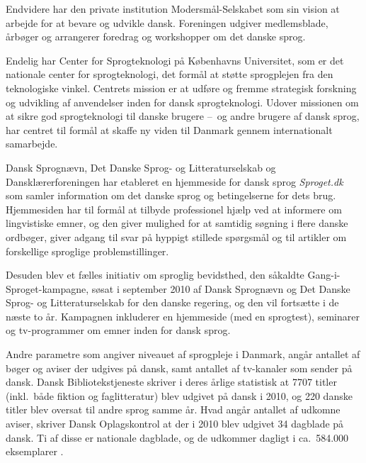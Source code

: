 \begin{multicols}{2}

Endvidere har den private institution Moders\-m\aa l-Selskabet som sin vision at arbejde for at bevare og udvikle dansk. Foreningen udgiver medlemsblade, \aa rb\o ger og arrangerer foredrag og workshopper om det danske sprog.


Endelig har Center for Sprogteknologi \mbox{p\aa} K\o benhavns Universitet, som er det nationale center for sprogtekno\-logi, det form\aa l at st\o tte sprogplejen fra den teknologiske vinkel. Centrets mission er at udf\o re og fremme strategisk forskning og udvikling af anvendelser inden for dansk sprogteknologi. Udover missionen om at sikre god sprogteknologi til danske brugere --~og andre brugere af dansk sprog, har centret til form\aa l at skaffe ny viden til Danmark gennem internationalt samarbejde.

Dansk Sprogn\ae vn, Det Danske Sprog- og Litteraturselskab og Danskl\ae rerforeningen har etableret en hjemmeside for dansk sprog {\it Sproget.dk} som samler information om det danske sprog og betingelserne for dets brug. Hjemmesiden har til form\aa l at tilbyde professionel hj\ae lp ved at informere om lingvistiske emner, og den giver mulighed for at samtidig s\o gning i flere danske ordb\o ger, giver adgang til svar \mbox{p\aa} hyppigt stillede sp\o rgsm\aa l og til artikler om forskellige sproglige problemstillinger.

\sloppy
Desuden blev et f\ae lles initiativ om sproglig bevidsthed, den s\aa kaldte Gang-i-Sproget-kampagne, s\o sat i september 2010 af Dansk Sprogn\ae vn og Det Danske Sprog- og Litteraturselskab for den danske regering, og den vil forts\ae tte i de n\ae ste to \aa r. Kampagnen inkluderer en hjemmeside (med en sprogtest), seminarer og tv-programmer om emner inden for dansk sprog.

Andre parametre som angiver niveauet af sprogpleje i Danmark, ang\aa r antallet af b\o ger og aviser der udgives \mbox{p\aa} dansk, samt antallet af tv-kanaler som sender \mbox{p\aa} dansk. Dansk Bibliotekstjeneste skriver i deres \aa rlige statistisk at 7707 titler (inkl.\ b\aa de fiktion og faglitte\-ratur) blev udgivet \mbox{p\aa} dansk i 2010, og 220 danske titler blev oversat til andre sprog samme \aa r. Hvad ang\aa r antallet af udkomne aviser, skriver Dansk Oplagskontrol at der i 2010 blev udgivet 34 dagblade \mbox{p\aa} dansk. Ti af disse er nationale dagblade, og de udkommer dagligt i ca.\ 584.000 eksemplarer \cite{ddo}.


\end{multicols}
